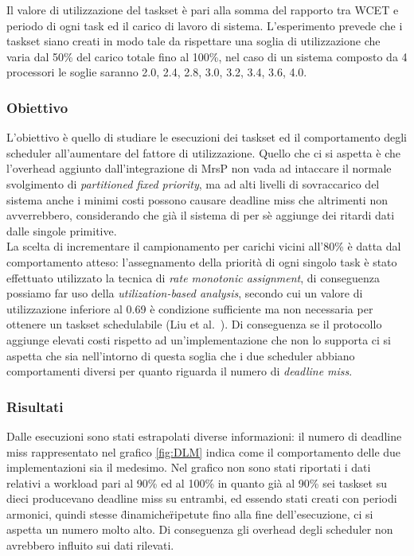 \noindent Il valore di utilizzazione del taskset è pari alla somma del rapporto tra WCET e periodo di ogni task ed il carico di lavoro di sistema. L'esperimento prevede che i taskset siano creati in modo tale da rispettare una soglia di utilizzazione che varia dal 50\% del carico totale fino al 100\%, nel caso di un sistema composto da 4 processori le soglie saranno 2.0, 2.4, 2.8, 3.0, 3.2, 3.4, 3.6, 4.0.

\subsubsection{Obiettivo}
\label{sec:confronto_norisorsa_ob}

\noindent L'obiettivo è quello di studiare le esecuzioni dei taskset ed il comportamento degli scheduler all'aumentare del fattore di utilizzazione. Quello che ci si aspetta è che l'overhead aggiunto dall'integrazione di MrsP non vada ad intaccare il normale svolgimento di \textit{partitioned fixed priority}, ma ad alti livelli di sovraccarico del sistema anche i minimi costi possono causare deadline miss che altrimenti non avverrebbero, considerando che già il sistema di per sè aggiunge dei ritardi dati dalle singole primitive.\\

\noindent La scelta di incrementare il campionamento per carichi vicini all'80\% è datta dal comportamento atteso: l'assegnamento della priorità di ogni singolo task è stato effettuato utilizzato la tecnica di \textit{rate monotonic assignment}, di conseguenza possiamo far uso della \textit{utilization-based analysis}, secondo cui un valore di utilizzazione inferiore al 0.69 è condizione sufficiente ma non necessaria per ottenere un taskset schedulabile (Liu et al.~\cite{Liu:1973:SAM:321738.321743}). Di conseguenza se il protocollo aggiunge elevati costi rispetto ad un'implementazione che non lo supporta ci si aspetta che sia nell'intorno di questa soglia che i due scheduler abbiano comportamenti diversi per quanto riguarda il numero di \textit{deadline miss}.\\

\subsubsection{Risultati}
\label{sec:confronto_norisorsa_ris}

\noindent Dalle esecuzioni sono stati estrapolati diverse informazioni: il numero di deadline miss rappresentato nel grafico \ref{fig:DLM} indica come il comportamento delle due implementazioni sia il medesimo. Nel grafico non sono stati riportati i dati relativi a workload pari al 90\% ed al 100\% in quanto già al 90\% sei taskset su dieci producevano deadline miss su entrambi, ed essendo stati creati con periodi armonici, quindi stesse \"dinamiche\" ripetute fino alla fine dell'esecuzione, ci si aspetta un numero molto alto. Di conseguenza gli overhead degli scheduler non avrebbero influito sui dati rilevati.\\

